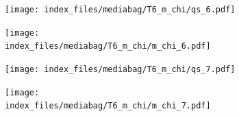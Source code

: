 \documentclass[
  11pt,
  letterpaper,
]{scrreprt}
\begin{document}
\begin{figure}

\begin{minipage}{0.50\linewidth}

\begin{figure}[H]

{\centering \texttt{[image: index\_files/mediabag/T6\_m\_chi/qs\_6.pdf]}

}


\end{figure}%

\end{minipage}%
%
\begin{minipage}{0.50\linewidth}

\begin{figure}[H]

{\centering \texttt{[image: index\_files/mediabag/T6\_m\_chi/m\_chi\_6.pdf]}

}


\end{figure}%

\end{minipage}%

\end{figure}%

\begin{figure}

\begin{minipage}{0.50\linewidth}

\begin{figure}[H]

{\centering \texttt{[image: index\_files/mediabag/T6\_m\_chi/qs\_7.pdf]}

}


\end{figure}%

\end{minipage}%
%
\begin{minipage}{0.50\linewidth}

\begin{figure}[H]

{\centering \texttt{[image: index\_files/mediabag/T6\_m\_chi/m\_chi\_7.pdf]}

}


\end{figure}%

\end{minipage}%

\end{figure}%
\end{document}

